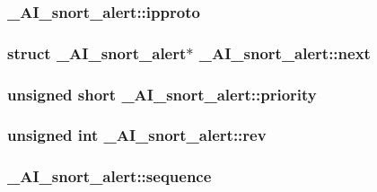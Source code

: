 \label{struct__AI__snort__alert_a523ef8842d01a1bc4ea3c0bf27518e78}
\hypertarget{struct__AI__snort__alert_a2a5f2741918c3c13890f2b617a7f23a4}{
\subsubsection[{ipproto}]{ {\bf \_\-AI\_\-snort\_\-alert::ipproto}}}
\label{struct__AI__snort__alert_a2a5f2741918c3c13890f2b617a7f23a4}
\hypertarget{struct__AI__snort__alert_aa8336d4b3359015ed8ea312ca1fd1173}{
\subsubsection[{next}]{\setlength{\rightskip}{0pt plus 5cm}struct {\bf \_\-AI\_\-snort\_\-alert}$\ast$ {\bf \_\-AI\_\-snort\_\-alert::next}}}
\label{struct__AI__snort__alert_aa8336d4b3359015ed8ea312ca1fd1173}
\hypertarget{struct__AI__snort__alert_a25661fa4e212c5e30af5e6a892985ec9}{
\subsubsection[{priority}]{\setlength{\rightskip}{0pt plus 5cm}unsigned short {\bf \_\-AI\_\-snort\_\-alert::priority}}}
\label{struct__AI__snort__alert_a25661fa4e212c5e30af5e6a892985ec9}
\hypertarget{struct__AI__snort__alert_a864d3baa48586d6a31639f4cd27d9d37}{
\subsubsection[{rev}]{\setlength{\rightskip}{0pt plus 5cm}unsigned int {\bf \_\-AI\_\-snort\_\-alert::rev}}}
\label{struct__AI__snort__alert_a864d3baa48586d6a31639f4cd27d9d37}
\hypertarget{struct__AI__snort__alert_acb20c4c55149d5806d7523720786ab77}{
\subsubsection[{sequence}]{ {\bf \_\-AI\_\-snort\_\-alert::sequence}}}
